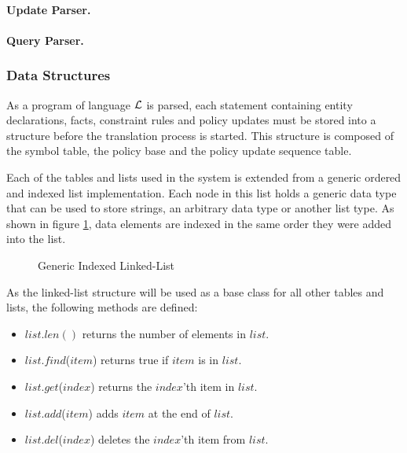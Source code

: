 \documentclass[10pt, twocolumn]{article}
\begin{document}
        \paragraph{Update Parser.}

        \paragraph{Query Parser.}

      \subsubsection{Data Structures}

        As a program of language ${\cal L}$ is parsed, each statement
        containing entity declarations, facts, constraint rules and policy
        updates must be stored into a structure before the translation process
        is started. This structure is composed of the symbol table, the policy
        base and the policy update sequence table.

        Each of the tables and lists used in the system is extended from a
        generic ordered and indexed list implementation. Each node in this list
        holds a generic data type that can be used to store strings, an
        arbitrary data type or another list type. As shown in figure \ref{fig-2},
        data elements are indexed in the same order they were added into the
        list.

        \begin{figure}[ht]
          \begin{center}
            \caption{Generic Indexed Linked-List}
            \label{fig-2}
          \end{center}
        \end{figure}

        As the linked-list structure will be used as a base class for all other
        tables and lists, the following methods are defined:

        \begin{itemize}
          \item
            $list.len()$
            returns the number of elements in $list$.
          \item
            $list$.$find$($item$)
            returns true if $item$ is in $list$.
          \item
            $list$.$get$($index$)
            returns the $index$'th item in $list$.
          \item
            $list$.$add$($item$)
            adds $item$ at the end of $list$.
          \item
            $list$.$del$($index$)
            deletes the $index$'th item from $list$.
        \end{itemize}
\end{document}
